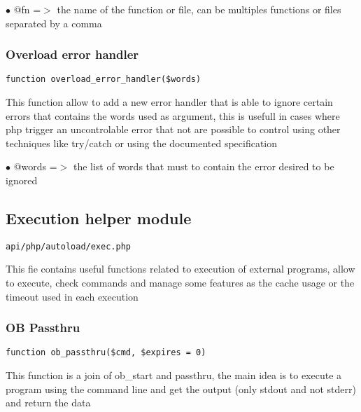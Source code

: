 \documentclass[a4paper]{article}
\begin{document}
\begin{compactitem}
\item[\color{myblue}$\bullet$] @fn =$>$ the name of the function or file, can be multiples functions or files separated
       by a comma
\end{compactitem}

\hypertarget{toc122}{}
\subsubsection{Overload error handler}

\begin{lstlisting}
function overload_error_handler($words)
\end{lstlisting}

This function allow to add a new error handler that is able to ignore certain errors
that contains the words used as argument, this is usefull in cases where php trigger
an uncontrolable error that not are possible to control using other techniques like
try/catch or using the documented specification

\begin{compactitem}
\item[\color{myblue}$\bullet$] @words =$>$ the list of words that must to contain the error desired to be ignored
\end{compactitem}

\hypertarget{toc123}{}
\subsection{Execution helper module}

\begin{lstlisting}
api/php/autoload/exec.php
\end{lstlisting}

This fie contains useful functions related to execution of external programs, allow to execute,
check commands and manage some features as the cache usage or the timeout used in each execution

\hypertarget{toc124}{}
\subsubsection{OB Passthru}

\begin{lstlisting}
function ob_passthru($cmd, $expires = 0)
\end{lstlisting}

This function is a join of ob\_start and passthru, the main idea
is to execute a program using the command line and get the
output (only stdout and not stderr) and return the data
\end{document}
